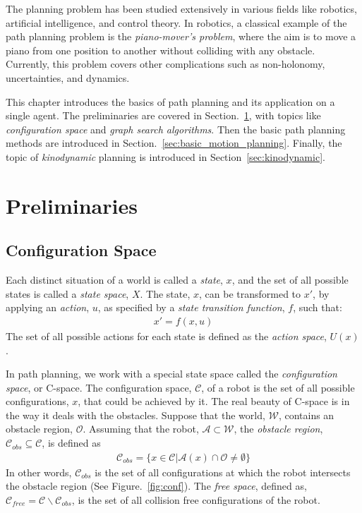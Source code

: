 The planning problem has been studied extensively in various fields like robotics, artificial intelligence, and control theory. In robotics, a classical example of the path planning problem is the \textit{piano-mover's problem}, where the aim is to move a piano from one position to another without colliding with any obstacle. Currently, this problem covers other complications such as non-holonomy, uncertainties, and dynamics.

This chapter introduces the basics of path planning and its application on a single agent. The preliminaries are covered in Section.~\ref{sec:prelims}, with topics like \textit{configuration space} and \textit{graph search algorithms}. Then the basic path planning methods are introduced in Section.~\ref{sec:basic_motion_planning}. Finally, the topic of \textit{kinodynamic} planning is introduced in Section~\ref{sec:kinodynamic}.
\section{Preliminaries}
\label{sec:prelims}
\subsection{Configuration Space}
\label{sec:config_space}
Each distinct situation of a world is called a \textit{state}, $x$, and the set of all possible states is called a \textit{state space}, $X$. The state, $x$, can be transformed to $x'$, by applying an \textit{action}, $u$, as specified by a \textit{state transition function}, $f$, such that:
\begin{align}
	x' = f(x,u)
\end{align}
The set of all possible actions for each state is defined as the \textit{action space}, $U(x)$.

In path planning, we work with a special state space called the \textit{configuration space}, or C-space. The configuration space, $\mathcal{C}$, of a robot is the set of all possible configurations, $x$, that could be achieved by it. The real beauty of C-space is in the way it deals with the obstacles. Suppose that the world, $\mathcal{W}$, contains an obstacle region, $\mathcal{O}$. Assuming that the robot, $\mathcal{A}\subset\mathcal{W}$, the \textit{obstacle region}, $\mathcal{C}_{obs}\subseteq\mathcal{C}$, is defined as
\begin{align}
	\mathcal{C}_{obs} = \{x\in\mathcal{C} | \mathcal{A}(x)\cap\mathcal{O}\neq\emptyset\}
\end{align}
In other words, $\mathcal{C}_{obs}$ is the set of all configurations at which the robot intersects the obstacle region (See Figure.~\ref{fig:conf}). The \textit{free space}, defined as, $\mathcal{C}_{free} = \mathcal{C} \backslash  \mathcal{C}_{obs}$, is the set of all collision free configurations of the robot. 

